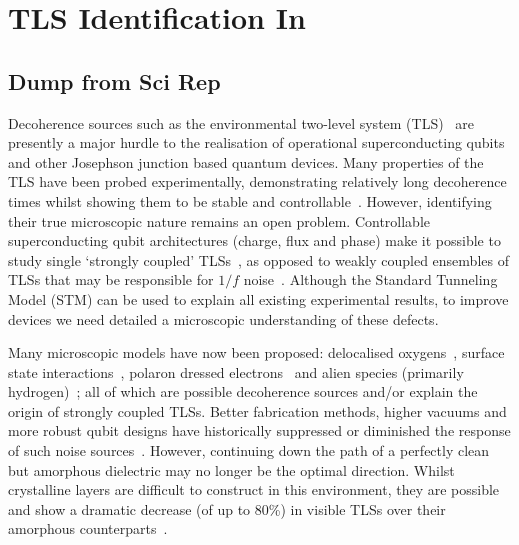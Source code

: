 \versoimage
\chapter{TLS Identification In }\label{ch:threedee}

\section{Dump from Sci Rep}
Decoherence sources such as the environmental two-level system (TLS)~\cite{Dutta1981, Shnirman2005} are presently a major hurdle to the realisation of operational superconducting qubits and other Josephson junction based quantum devices.
Many properties of the TLS have been probed experimentally, demonstrating relatively long decoherence times whilst showing them to be stable and controllable~\cite{Simmonds2004, Neeley2008, Shalibo2010, Lupascu2009, Lisenfeld2010}.
However, identifying their true microscopic nature remains an open problem. Controllable superconducting qubit architectures (charge, flux and phase) make it possible to study single `strongly coupled' TLSs~\cite{Neeley2008, Lupascu2009, Lisenfeld2010}, as opposed to weakly coupled ensembles of TLSs that may be responsible for $1/f$ noise~\cite{Dutta1981,Schriefl2006}.
Although the Standard Tunneling Model (STM) \cite{Anderson1972, Phillips1972} can be used to explain all existing experimental results, to improve devices we need detailed a microscopic understanding of these defects.

Many microscopic models have now been proposed: delocalised oxygens~\cite{DuBois2013,DuBois2015}, surface state interactions~\cite{Choi2009,Lee2014}, polaron dressed electrons~\cite{Agarwal2013} and alien species (primarily hydrogen)~\cite{Jameson2011, Holder2013, Gordon2014}; all of which are possible decoherence sources and/or explain the origin of strongly coupled TLSs.
Better fabrication methods, higher vacuums and more robust qubit designs have historically suppressed or diminished the response of such noise sources~\cite{Vion2002, Martinis2005, Koch2007, Schreier2008, Houck2008}.
However, continuing down the path of a perfectly clean but amorphous dielectric may no longer be the optimal direction. Whilst crystalline layers are difficult to construct in this environment, they are possible and show a dramatic decrease (of up to 80\%) in visible TLSs over their amorphous counterparts~\cite{Oh2006}.

